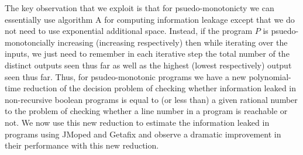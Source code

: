 The key observation that we exploit is that for psuedo-monotonicty we can essentially use algorithm A for computing information leakage except that we do not need to use exponential additional space. Instead, if the program $P$ is psuedo-monotoncially increasing (increasing respectively) then while iterating over the inputs,  we just need to remember in each iterative step  the total number of the distinct outputs seen thus far as well as the highest  (lowest respectively) output seen thus far. Thus, for psudeo-monotonic programs we have a new polynomial-time reduction of the decision problem of checking whether information leaked  in non-recursive boolean programs is  equal to (or less than) a given rational number to the problem of checking whether a line number in a program is reachable or not.  We now use this new reduction to estimate the information leaked in programs using JMoped and Getafix and  observe a dramatic improvement in their performance with this new reduction.



  
  













